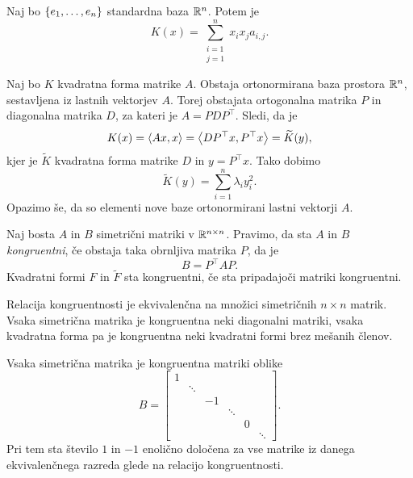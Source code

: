 \documentclass[12pt, a4paper]{article}
\begin{document}
\begin{opomba}
Naj bo $\left\{e_1,\dots,e_n\right\}$ standardna baza $\mathbb{R}^n$. Potem je
\[
K(x)=\sum_{\substack{i=1 \\ j=1}}^n x_ix_ja_{i,j}.
\]
\end{opomba}

\begin{opomba}
Naj bo $K$ kvadratna forma matrike $A$. Obstaja ortonormirana baza prostora $\mathbb{R}^n$, sestavljena iz lastnih vektorjev $A$. Torej obstajata ortogonalna matrika $P$ in diagonalna matrika $D$, za kateri je $A=PDP^\top$. Sledi, da je
\[
K(x)=\left\langle Ax,x\right\rangle=\left\langle DP^\top x,P^\top x\right\rangle=\widetilde{K}(y),
\]
kjer je $\widetilde{K}$ kvadratna forma matrike $D$ in $y=P^\top x$. Tako dobimo
\[
\widetilde{K}(y)=\sum_{i=1}^n\lambda_i y_i^2.
\]
Opazimo še, da so elementi nove baze ortonormirani lastni vektorji $A$.
\end{opomba}

\begin{definicija}
Naj bosta $A$ in $B$ simetrični matriki v $\mathbb{R}^{n\times n}$. Pravimo, da sta $A$ in $B$ \emph{kongruentni}, če obstaja taka obrnljiva matrika $P$, da je
\[
B=P^\top AP.
\]
Kvadratni formi $F$ in $\widetilde{F}$ sta kongruentni, če sta pripadajoči matriki kongruentni.
\end{definicija}

\begin{opomba}
Relacija kongruentnosti je ekvivalenčna na množici simetričnih $n\times n$ matrik. Vsaka simetrična matrika je kongruentna neki diagonalni matriki, vsaka kvadratna forma pa je kongruentna neki kvadratni formi brez mešanih členov.
\end{opomba}

\begin{izrek}[Sylvester]
Vsaka simetrična matrika je kongruentna matriki oblike
\[
B=\begin{bmatrix}
1 & & & & & \\ 
& \ddots & & & & \\ 
& & -1 & & & \\ 
& & & \ddots & & \\ 
& & & & 0 & \\ 
& & & & & \ddots 
\end{bmatrix}.
\]
Pri tem sta število $1$ in $-1$ enolično določena za vse matrike iz danega ekvivalenčnega razreda glede na relacijo kongruentnosti.
\end{izrek}
\end{document}
